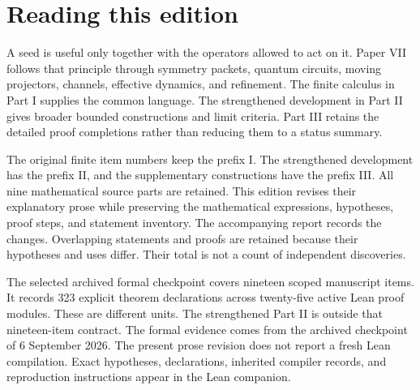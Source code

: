 \documentclass[11pt,letterpaper]{article}
\theoremstyle{definition}
\theoremstyle{remark}
\begin{document}
\KomorebiCover
\begingroup
\setlength{\parskip}{3pt plus .5pt minus .5pt}

\section*{Reading this edition}
A seed is useful only together with the operators allowed to act on it. Paper VII follows that principle through symmetry packets, quantum circuits, moving projectors, channels, effective dynamics, and refinement. The finite calculus in Part I supplies the common language. The strengthened development in Part II gives broader bounded constructions and limit criteria. Part III retains the detailed proof completions rather than reducing them to a status summary.

The original finite item numbers keep the prefix I. The strengthened development has the prefix II, and the supplementary constructions have the prefix III. All nine mathematical source parts are retained. This edition revises their explanatory prose while preserving the mathematical expressions, hypotheses, proof steps, and statement inventory. The accompanying report records the changes. Overlapping statements and proofs are retained because their hypotheses and uses differ. Their total is not a count of independent discoveries.

The selected archived formal checkpoint covers nineteen scoped manuscript items. It records 323 explicit theorem declarations across twenty-five active Lean proof modules. These are different units. The strengthened Part II is outside that nineteen-item contract. The formal evidence comes from the archived checkpoint of 6 September 2026. The present prose revision does not report a fresh Lean compilation. Exact hypotheses, declarations, inherited compiler records, and reproduction instructions appear in the Lean companion.
\end{document}
